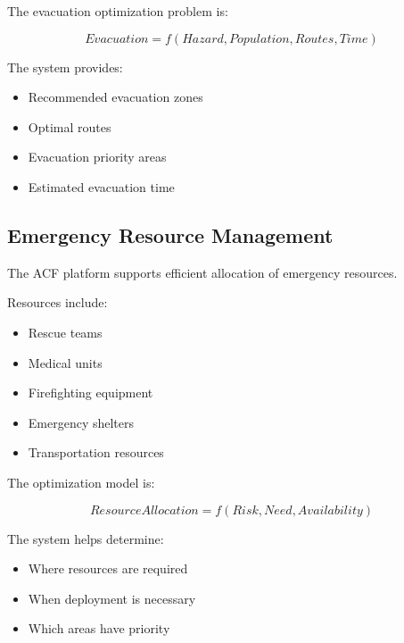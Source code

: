 The evacuation optimization problem is:

\[
Evacuation=
f(Hazard,Population,Routes,Time)
\]


The system provides:

\begin{itemize}

\item Recommended evacuation zones

\item Optimal routes

\item Evacuation priority areas

\item Estimated evacuation time

\end{itemize}



\subsection{Emergency Resource Management}

The ACF platform supports efficient allocation of emergency resources.

Resources include:

\begin{itemize}

\item Rescue teams

\item Medical units

\item Firefighting equipment

\item Emergency shelters

\item Transportation resources

\end{itemize}


The optimization model is:

\[
ResourceAllocation
=
f(Risk,Need,Availability)
\]


The system helps determine:

\begin{itemize}

\item Where resources are required

\item When deployment is necessary

\item Which areas have priority

\end{itemize}


